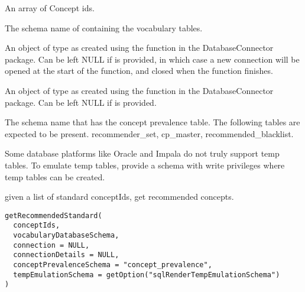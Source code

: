 \documentclass[a4paper]{book}
\begin{document}
%
\begin{Arguments}
\begin{ldescription}
\item[\code{conceptIds}] An array of Concept ids.

\item[\code{vocabularyDatabaseSchema}] The schema name of containing the vocabulary tables.

\item[\code{connection}] An object of type  as created using the
 function in the
DatabaseConnector package. Can be left NULL if 
is provided, in which case a new connection will be opened at the start
of the function, and closed when the function finishes.

\item[\code{connectionDetails}] An object of type  as created using the
 function in the
DatabaseConnector package. Can be left NULL if  is
provided.

\item[\code{conceptPrevalenceSchema}] The schema name that has the concept prevalence table. The following
tables are expected to be present. recommender\_set,
cp\_master, recommended\_blacklist.

\item[\code{tempEmulationSchema}] Some database platforms like Oracle and Impala do not truly support temp tables. To emulate temp 
tables, provide a schema with write privileges where temp tables can be created.
\end{ldescription}
\end{Arguments}
%
\begin{Description}\relax
given a list of standard conceptIds, get recommended concepts.
\end{Description}
%
\begin{Usage}
\begin{verbatim}
getRecommendedStandard(
  conceptIds,
  vocabularyDatabaseSchema,
  connection = NULL,
  connectionDetails = NULL,
  conceptPrevalenceSchema = "concept_prevalence",
  tempEmulationSchema = getOption("sqlRenderTempEmulationSchema")
)
\end{verbatim}
\end{Usage}
\end{document}
